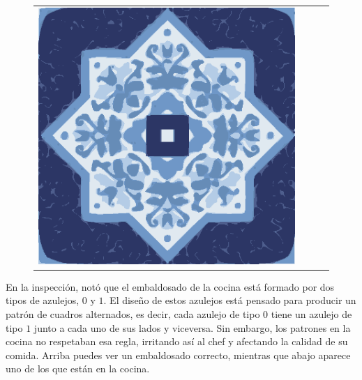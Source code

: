 \documentclass{oci}
\begin{document}
\begin{problemDescription}
\begin{figure}[h]
\begin{center}
{\begin{tabular}{cccc}
        \includegraphics[scale=0.3]{a.eps}
      \end{tabular}
    }
  \end{center}
\end{figure}

En la inspección, notó que el embaldosado de la cocina está formado por dos tipos de azulejos, $0$ y $1$.
El diseño de estos azulejos está pensado para producir un patrón de cuadros alternados, es decir, cada azulejo de tipo $0$ tiene un azulejo de tipo $1$ junto a cada uno de sus lados y viceversa.
Sin embargo, los patrones en la cocina no respetaban esa regla, irritando así al chef y afectando la calidad de su comida.
Arriba puedes ver un embaldosado correcto, mientras que abajo aparece uno de los que están en la cocina.


\end{problemDescription}
\end{document}
